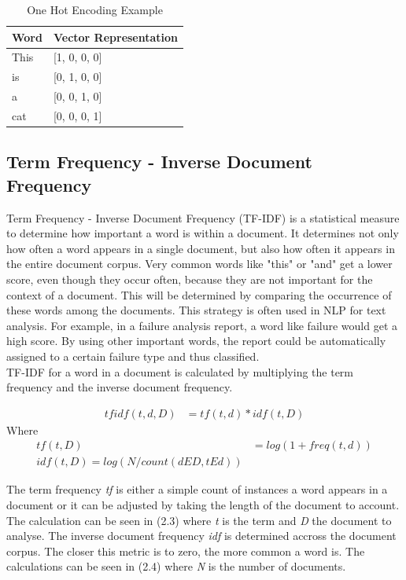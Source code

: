 \begin{table}[H]
	\centering
	\begin{tabular}{ll}
		\hline
		\textbf{Word} & \textbf{Vector Representation} \\ \hline
		This & [1, 0, 0, 0]\\ 
		is    & [0, 1, 0, 0]\\ 
		a & [0, 0, 1, 0]\\ 
		cat  & [0, 0, 0, 1]\\ \hline
	\end{tabular}
	\caption{One Hot Encoding Example}
	\label{tab:onehot}
\end{table}

\subsection{Term Frequency - Inverse Document Frequency}
Term Frequency - Inverse Document Frequency (TF-IDF) is a statistical measure to determine how important a word is within a document. It determines not only how often a word appears in a single document, but also how often it appears in the entire document corpus. Very common words like "this" or "and" get a lower score, even though they occur often, because they are not important for the context of a document. This will be determined by comparing the occurrence of these words among the documents. This strategy is often used in NLP for text analysis. For example, in a failure analysis report, a word like failure would get a high score. By using other important words, the report could be automatically assigned to a certain failure type and thus classified. \\
TF-IDF for a word in a document is calculated by multiplying the term frequency and the inverse document frequency.

\begin{align}
	tf idf (t, d, D) &= tf(t, d) * idf(t, D)
\end{align}
Where
\begin{align}
	tf (t, D) &= log(1 + freq(t, d)) \\
	idf(t, D) = log(N/count(d E D, t E d))
\end{align}

The term frequency \textit{tf} is either a simple count of instances a word appears in a document or it can be adjusted by taking the length of the document to account. The calculation can be seen in (2.3) where \textit{t} is the term and \textit{D} the document to analyse. The inverse document frequency \textit{idf} is determined accross the document corpus. The closer this metric is to zero, the more common a word is. The calculations can be seen in (2.4) where \textit{N} is the number of documents.

